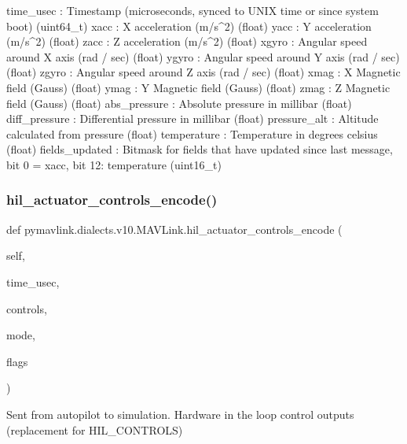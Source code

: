 \begin{DoxyVerb}
\begin{DoxyVerb}
\begin{DoxyVerb}
time_usec                 : Timestamp (microseconds, synced to UNIX time or since system boot) (uint64_t)
xacc                      : X acceleration (m/s^2) (float)
yacc                      : Y acceleration (m/s^2) (float)
zacc                      : Z acceleration (m/s^2) (float)
xgyro                     : Angular speed around X axis (rad / sec) (float)
ygyro                     : Angular speed around Y axis (rad / sec) (float)
zgyro                     : Angular speed around Z axis (rad / sec) (float)
xmag                      : X Magnetic field (Gauss) (float)
ymag                      : Y Magnetic field (Gauss) (float)
zmag                      : Z Magnetic field (Gauss) (float)
abs_pressure              : Absolute pressure in millibar (float)
diff_pressure             : Differential pressure in millibar (float)
pressure_alt              : Altitude calculated from pressure (float)
temperature               : Temperature in degrees celsius (float)
fields_updated            : Bitmask for fields that have updated since last message, bit 0 = xacc, bit 12: temperature (uint16_t)\end{DoxyVerb}
 \mbox{\label{classpymavlink_1_1dialects_1_1v10_1_1MAVLink_a11666b39c56f547eca6e490c8289b9a9}} 
\subsubsection{\texorpdfstring{hil\+\_\+actuator\+\_\+controls\+\_\+encode()}{hil\_actuator\_controls\_encode()}}
{\footnotesize\ttfamily def pymavlink.\+dialects.\+v10.\+M\+A\+V\+Link.\+hil\+\_\+actuator\+\_\+controls\+\_\+encode (\begin{DoxyParamCaption}\item[{}]{self,  }\item[{}]{time\+\_\+usec,  }\item[{}]{controls,  }\item[{}]{mode,  }\item[{}]{flags }\end{DoxyParamCaption})}

\begin{DoxyVerb}Sent from autopilot to simulation. Hardware in the loop control
outputs (replacement for HIL_CONTROLS)


\end{DoxyVerb}
\end{DoxyVerb}
\end{DoxyVerb}
